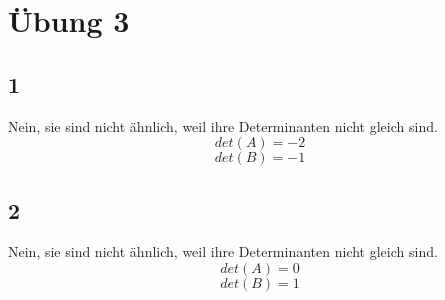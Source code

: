 \documentclass[10pt,a4paper]{article}
\begin{document}
\section*{Übung 3}

\subsection*{1}

Nein, sie sind nicht ähnlich, weil ihre Determinanten nicht gleich sind.
\begin{equation}
det(A) = -2
\end{equation}
\begin{equation}
det(B) = -1
\end{equation}

\subsection*{2}

Nein, sie sind nicht ähnlich, weil ihre Determinanten nicht gleich sind.
\begin{equation}
det(A) = 0
\end{equation}
\begin{equation}
det(B) = 1
\end{equation}
\end{document}
